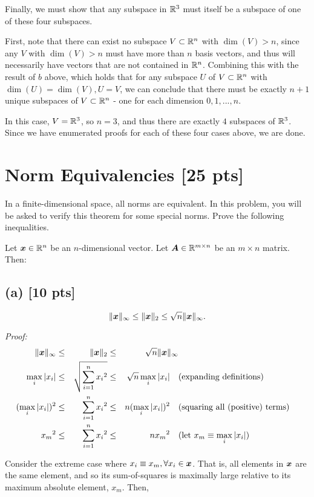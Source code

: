 \documentclass[twoside,10pt]{article}
\newcommand{\aln}[1]{\begin{align}#1\end{align}}
\newcommand{\s}{\enspace}
\begin{document}
Finally, we must show that any subspace in $\mathbb{R}^3$ must itself be a subspace of one of these four subspaces.

First, note that there can exist no subspace $V \subset \mathbb{R}^n$ with $\dim(V) > n$, since any $V$ with $\dim(V) > n$ must have more than $n$ basis vectors, and thus will necessarily have vectors that are not contained in $\mathbb{R}^n$.
Combining this with the result of $\textit{b}$ above, which holds that for any subspace $U$ of $V \subset \mathbb{R}^n$ with $\dim(U) = \dim(V), U = V$, we can conclude that there must be exactly $n + 1$ unique subspaces of $V \subset \mathbb{R}^n$ - one for each dimension $0, 1, ..., n$.

In this case, $V = \mathbb{R}^3$, so $n = 3$, and thus there are exactly $4$ subspaces of $\mathbb{R}^3$.
Since we have enumerated proofs for each of these four cases above, we are done.

\section{Norm Equivalencies [25 pts]}
In a finite-dimensional space, all norms are equivalent. In this problem, you will be asked to verify this theorem for some special norms. Prove the following inequalities. 

Let $\bm{x} \in \mathbb{R}^n$ be an $n$-dimensional vector. Let $\bm{A} \in \mathbb{R}^{m \times n}$ be an $m \times n$ matrix. Then: 

\subsection*{(a) [10 pts]}
\begin{equation*}
  \|\bm{x}\|_{\infty} \leq \|\bm{x}\|_2 \leq \sqrt{n}\|\bm{x}\|_{\infty}.
\end{equation*}

\textit{Proof:}
\aln{
  \|\vct{x}\|_{\infty} &\leq &\|\vct{x}\|_2 &\leq &\sqrt{n}\|\vct{x}\|_{\infty}\\
  \max_{i}{|x_i|} &\leq &\sqrt{\sum_{i=1}^{n}{{x_i}^2}} &\leq &\sqrt{n}\max_{i}{|x_i|} \s\s &\text{(expanding definitions)}\\
  (\max_{i}{|x_i|})^2 &\leq &\sum_{i=1}^{n}{{x_i}^2} &\leq &n(\max_{i}{|x_i|})^2 \s\s &\text{(squaring all (positive) terms)}\\
  {x_m}^2 &\leq &\sum_{i=1}^{n}{{x_i}^2} &\leq &n{x_m}^2 \s\s &\text{(let $x_m \equiv \max_{i}{|x_i|}$)}
}

Consider the extreme case where $x_i \equiv x_m, \forall{x_i \in \bm{x}}$.
That is, all elements in $\bm{x}$ are the same element, and so its sum-of-squares is maximally large relative to its maximum absolute element, $x_m$.
Then,
\end{document}
